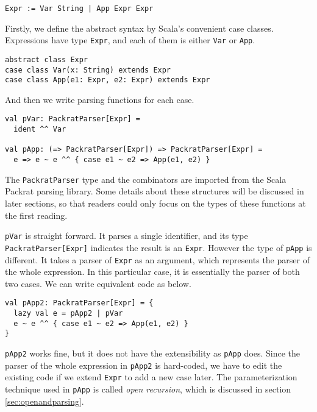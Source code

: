 \begin{lstlisting}[language=PlainCode]
Expr := Var String | App Expr Expr
\end{lstlisting}

Firstly, we define the abstract syntax by Scala's convenient case classes. Expressions have type \lstinline{Expr}, and each of them is either \lstinline{Var} or \lstinline{App}.

\begin{lstlisting}
abstract class Expr
case class Var(x: String) extends Expr
case class App(e1: Expr, e2: Expr) extends Expr
\end{lstlisting}

And then we write parsing functions for each case.

\begin{lstlisting}
val pVar: PackratParser[Expr] =
  ident ^^ Var

val pApp: (=> PackratParser[Expr]) => PackratParser[Expr] =
  e => e ~ e ^^ { case e1 ~ e2 => App(e1, e2) }
\end{lstlisting}

The \lstinline{PackratParser} type and the combinators are imported from the Scala Packrat parsing library. Some details about these structures will be discussed in later sections, so that readers could only focus on the types of these functions at the first reading.

\lstinline{pVar} is straight forward. It parses a single identifier, and its type \lstinline{PackratParser[Expr]} indicates the result is an \lstinline{Expr}. However the type of \lstinline{pApp} is different. It takes a parser of \lstinline{Expr} as an argument, which represents the parser of the whole expression. In this particular case, it is essentially the parser of both two cases. We can write equivalent code as below.

\begin{lstlisting}
val pApp2: PackratParser[Expr] = {
  lazy val e = pApp2 | pVar
  e ~ e ^^ { case e1 ~ e2 => App(e1, e2) }
}
\end{lstlisting}

\lstinline{pApp2} works fine, but it does not have the extensibility as \lstinline{pApp} does. Since the parser of the whole expression in \lstinline{pApp2} is hard-coded, we have to edit the existing code if we extend \lstinline{Expr} to add a new case later. The parameterization technique used in \lstinline{pApp} is called \textit{open recursion}, which is discussed in section \ref{sec:openandparsing}.

